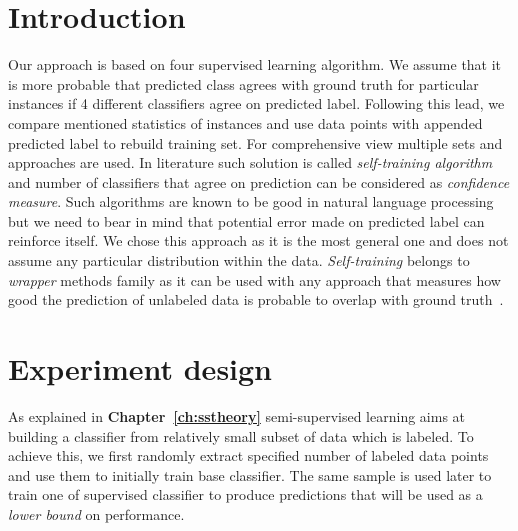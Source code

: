 \documentclass[12pt, a4paper, pdflatex]{report}
\begin{document}
\section{Introduction}
Our approach is based on four supervised learning algorithm. We assume that it is more probable that predicted class agrees with ground truth for particular instances if 4 different classifiers agree on predicted label. Following this lead, we compare mentioned statistics of instances and use data points with appended predicted label to rebuild training set. For comprehensive view multiple sets and approaches are used. In literature such solution is called \emph{self-training algorithm} and number of classifiers that agree on prediction can be considered as \emph{confidence measure}. Such algorithms are known to be good in natural language processing but we need to bear in mind that potential error made on predicted label can reinforce itself. We chose this approach as it is the most general one and does not assume any particular distribution within the data. \emph{Self-training} belongs to \emph{wrapper} methods family as it can be used with any approach that measures how good the prediction of unlabeled data is probable to overlap with ground truth~\cite{zhu2009introduction}.

\section{Experiment design}
As explained in \textbf{Chapter~\ref{ch:sstheory}} semi-supervised learning aims at building a classifier from relatively small subset of data which is labeled. To achieve this, we first randomly extract specified number of labeled data points and use them to initially train base classifier. The same sample is used later to train one of supervised classifier to produce predictions that will be used as a \emph{lower bound} on performance.
\end{document}
